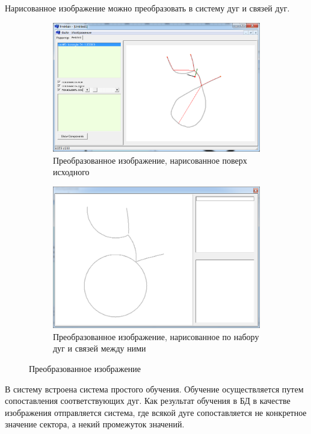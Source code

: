Нарисованное изображение можно преобразовать в систему дуг и связей дуг.

\begin{figure}[h]
	\begin{subfigure}{.45\textwidth}
		\centering
		\includegraphics[width=.9\linewidth]{images/an_convertor_1.png}
		\caption{Преобразованное изображение, нарисованное поверх исходного}
	\end{subfigure}
	\begin{subfigure}{.45\textwidth}
		\centering
		\includegraphics[width=.9\linewidth]{images/an_convertor_3.png}
		\caption{Преобразованное изображение, нарисованное по набору дуг и связей между ними}
	\end{subfigure}
	\caption{Преобразованное изображение}
\end{figure}

В систему встроена система простого обучения. Обучение осуществляется путем сопоставления соответствующих дуг. Как результат обучения в БД в качестве изображения отправляется система, где всякой дуге сопоставляется не конкретное значение сектора, а некий промежуток значений.

